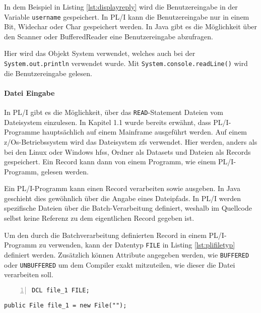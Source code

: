In dem Beispiel in Listing \ref{lst:displayreply} wird die Benutzereingabe in der
Variable \verb+username+ gespeichert.
In PL/I kann die Benutzereingabe nur in einem Bit, Widechar oder Char gespeichert werden. 
In Java gibt es die Möglichkeit über den Scanner oder BufferedReader eine Benutzereingabe abzufragen.

Hier wird das Objekt System verwendet, welches auch bei der \verb+System.out.println+ verwendet wurde.
Mit \verb+System.console.readLine()+ wird die Benutzereingabe gelesen.

\paragraph*{Datei Eingabe}
In PL/I gibt es die Möglichkeit, über das \verb+READ+-Statement Dateien vom Dateisystem einzulesen.
In Kapitel 1.1 wurde bereits erwähnt, dass PL/I-Programme hauptsächlich auf einem Mainframe ausgeführt werden.
Auf einem z/Os-Betriebssystem wird das Dateisystem \ac{zfs} verwendet.
Hier werden, anders als bei den  Linux oder Windows \ac{hfs}s, Ordner als Datasets und Dateien als Records gespeichert.
Ein Record kann dann von einem Programm, wie einem PL/I-Programm, gelesen werden.

Ein PL/I-Programm kann einen Record verarbeiten sowie ausgeben. In Java geschieht dies gewöhnlich über die Angabe eines Dateipfads.
In PL/I werden spezifische Dateien über die Batch-Verarbeitung definiert, weshalb im Quellcode selbst keine Referenz zu dem eigentlichen Record gegeben ist.

Um den durch die Batchverarbeitung definierten Record in einem PL/I-Programm zu verwenden, kann der Datentyp \verb+FILE+ in Listing \ref{lst:plifiletyp} definiert werden. Zusätzlich können Attribute angegeben werden, wie \verb+BUFFERED+ oder \verb+UNBUFFERED+ um dem Compiler exakt mitzuteilen, wie dieser die Datei verarbeiten soll.

\begin{minipage}[b]{0.48\linewidth}
	\centering
	\lstset{language=PL/I,label=SliceExaple}
	\begin{lstlisting}[frame=single, numbers=left, mathescape,%
		caption={Transformation Dateityp}, label={lst:plifiletyp}]
 DCL file_1 FILE;
	\end{lstlisting}
\end{minipage}
\hspace{0.5cm}
\begin{minipage}[b]{0.48\linewidth}
	\centering
	\lstset{language=Java,label=SliceExaple}
	\begin{lstlisting}[frame=single, mathescape,%
		title={" "}]
 public File file_1 = new File("");
	\end{lstlisting}
\end{minipage}  

